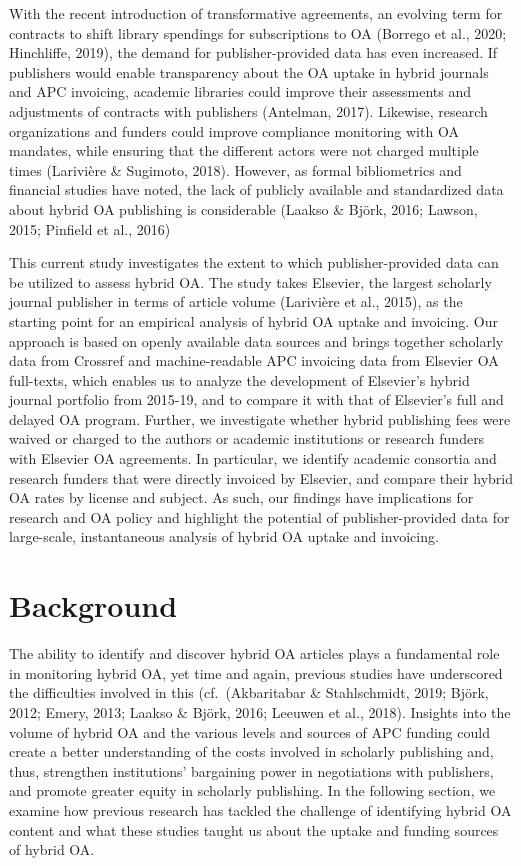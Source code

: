 \documentclass[a4paper,man,floatsintext,longtable,noextraspace,12pt]{apa6}
\begin{document}
With the recent introduction of transformative agreements, an evolving
term for contracts to shift library spendings for subscriptions to OA
(Borrego et al., 2020; Hinchliffe, 2019), the demand for
publisher-provided data has even increased. If publishers would enable
transparency about the OA uptake in hybrid journals and APC invoicing,
academic libraries could improve their assessments and adjustments of
contracts with publishers (Antelman, 2017). Likewise, research
organizations and funders could improve compliance monitoring with OA
mandates, while ensuring that the different actors were not charged
multiple times (Larivière \& Sugimoto, 2018). However, as formal
bibliometrics and financial studies have noted, the lack of publicly
available and standardized data about hybrid OA publishing is
considerable (Laakso \& Björk, 2016; Lawson, 2015; Pinfield et al.,
2016)

This current study investigates the extent to which publisher-provided
data can be utilized to assess hybrid OA. The study takes Elsevier, the
largest scholarly journal publisher in terms of article volume
(Larivière et al., 2015), as the starting point for an empirical
analysis of hybrid OA uptake and invoicing. Our approach is based on
openly available data sources and brings together scholarly data from
Crossref and machine-readable APC invoicing data from Elsevier OA
full-texts, which enables us to analyze the development of Elsevier's
hybrid journal portfolio from 2015-19, and to compare it with that of
Elsevier's full and delayed OA program. Further, we investigate whether
hybrid publishing fees were waived or charged to the authors or academic
institutions or research funders with Elsevier OA agreements. In
particular, we identify academic consortia and research funders that
were directly invoiced by Elsevier, and compare their hybrid OA rates by
license and subject. As such, our findings have implications for
research and OA policy and highlight the potential of publisher-provided
data for large-scale, instantaneous analysis of hybrid OA uptake and
invoicing.

\hypertarget{background}{%
\section{Background}\label{background}}

The ability to identify and discover hybrid OA articles plays a
fundamental role in monitoring hybrid OA, yet time and again, previous
studies have underscored the difficulties involved in this
(cf.~(Akbaritabar \& Stahlschmidt, 2019; Björk, 2012; Emery, 2013;
Laakso \& Björk, 2016; Leeuwen et al., 2018). Insights into the volume
of hybrid OA and the various levels and sources of APC funding could
create a better understanding of the costs involved in scholarly
publishing and, thus, strengthen institutions' bargaining power in
negotiations with publishers, and promote greater equity in scholarly
publishing. In the following section, we examine how previous research
has tackled the challenge of identifying hybrid OA content and what
these studies taught us about the uptake and funding sources of hybrid
OA.
\end{document}
